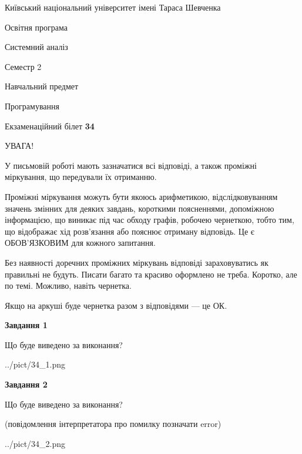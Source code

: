 \documentclass[12pt, ukrainian]{article}
\begin{document}
{{\begin {small}\par
{ \center  Київський національний університет імені Тараса Шевченка \par}
{\parbox {5 cm}{Освітня програма \hfill}{\parbox {7 cm}{Системний аналіз \hfill}}\parbox {6 cm}{\hfill Семестр 2}}\par
{\parbox {5 cm} {Навчальний предмет \hfill}\parbox {7 cm}{Програмування \hfill}\parbox {6cm}{\hfill}\par}\vspace{-7pt} \end{small}}{\center Екзаменаційний білет \No \textbf
{ 34 }\par}}
{
\begin {large}
УВАГА!

У письмовій роботі мають зазначатися всі відповіді, а також проміжні міркування, що передували їх отриманню.

Проміжні міркування можуть бути якоюсь арифметикою, відслідковуванням зна\-чень змінних для деяких завдань,
короткими поясненнями, допоміжною інформацією, що виникає під час обходу графів, робочею чернеткою,
тобто тим, що відображає хід розв’язання або пояснює отриману відповідь.
Це є ОБОВ’ЯЗКОВИМ для кожного запитання.

Без наявності доречних проміжних міркувань відповіді зараховуватись як правиль\-ні не будуть.
Писати багато та красиво оформлено не треба. Коротко, але по темі. Можли\-во, навіть чернетка.

Якщо на аркуші буде чернетка разом з відповідями --- це ОК.

\newpage

{\begin {center}\textbf{Завдання 1}\end {center}}\par
Що буде виведено за виконання?\par
\begin{center}
	{../pict/34_1.png}
\end{center}
\newpage

{\begin {center}\textbf{Завдання 2}\end {center}}\par
Що буде виведено за виконання?\par
 (повідомлення інтерпретатора про помилку позначати error)\par
\begin{center}
	{../pict/34_2.png}
\end{center}
\newpage


\end{large}}
\end{document}
